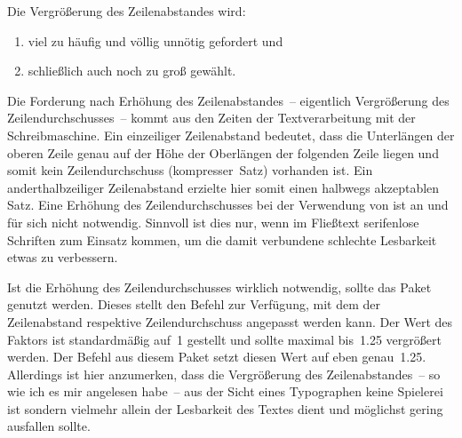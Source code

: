 \begin{DeclarePackages}
  Die Vergrößerung des Zeilenabstandes wird:
  \begin{enumerate}[itemindent=0pt,labelwidth=*,labelsep=1em,label=\Roman*.]
  \item viel zu häufig und völlig unnötig gefordert und
  \item schließlich auch noch zu groß gewählt.
  \end{enumerate}
  Die Forderung nach Erhöhung des Zeilenabstandes~-- eigentlich Vergrößerung 
  des Zeilendurchschusses~-- kommt aus den Zeiten der Textverarbeitung mit der 
  Schreibmaschine. Ein einzeiliger Zeilenabstand bedeutet, dass die 
  Unterlängen der oberen Zeile genau auf der Höhe der Oberlängen der folgenden 
  Zeile liegen und somit kein Zeilendurchschuss (kompresser~Satz) vorhanden 
  ist. Ein anderthalbzeiliger Zeilenabstand erzielte hier somit einen halbwegs 
  akzeptablen Satz. Eine Erhöhung des Zeilendurchschusses bei der Verwendung 
  von  ist an und für sich nicht notwendig. Sinnvoll ist dies 
  nur, wenn im Fließtext serifenlose Schriften zum Einsatz kommen, um die damit 
  verbundene schlechte Lesbarkeit etwas zu verbessern.
  
  Ist die Erhöhung des Zeilendurchschusses wirklich notwendig, sollte das Paket 
   genutzt werden. Dieses stellt den Befehl 
   zur Verfügung, mit dem der Zeilenabstand 
  respektive Zeilendurchschuss angepasst werden kann. Der Wert des Faktors ist 
  standardmäßig auf~1 gestellt und sollte maximal bis~1.25 vergrößert werden. 
  Der Befehl  aus diesem Paket setzt diesen Wert auf eben 
  genau~1.25. Allerdings ist hier anzumerken, dass die Vergrößerung des 
  Zeilenabstandes~-- so wie ich es mir angelesen habe~-- aus der Sicht eines 
  Typographen keine Spielerei ist sondern vielmehr allein der Lesbarkeit des 
  Textes dient und möglichst gering ausfallen sollte.
  

\end{DeclarePackages}
